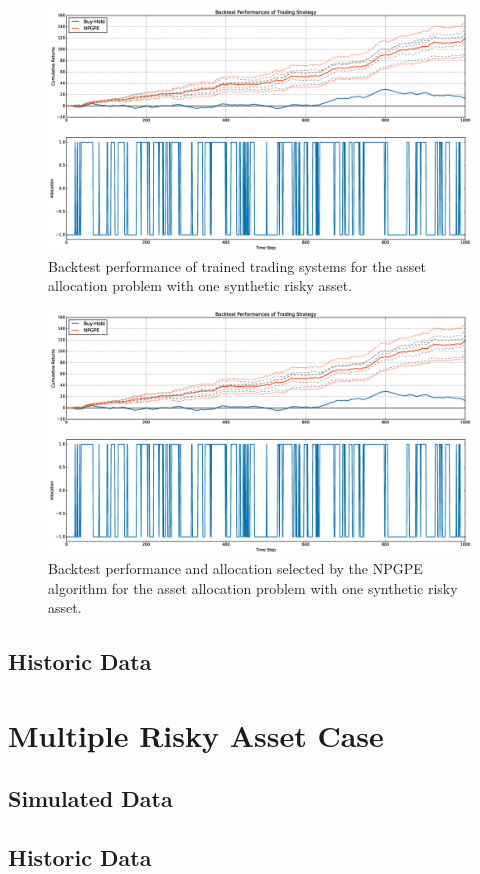 \begin{figure}[t]
	\centering
	\includegraphics[width=1.0\textwidth]{Images/6_1_single_synthetic_performance}
	\caption[Backtest performance with one synthetic risky asset]{Backtest performance of trained trading systems for the asset allocation problem with one synthetic risky asset.}
	\label{fig:single_synthetic_performance}
\end{figure}

\begin{figure}[t]
	\centering
	\includegraphics[width=1.0\textwidth]{Images/6_2_single_synthetic_NPGPE}
	\caption[Backtest performance of NPGPE with one synthetic risky asset]{Backtest performance and allocation selected by the NPGPE algorithm for the asset allocation problem with one synthetic risky asset.}
	\label{fig:single_synthetic_NPGPE}
\end{figure}


\subsection{Historic Data}



\section{Multiple Risky Asset Case}

\subsection{Simulated Data}


\subsection{Historic Data}